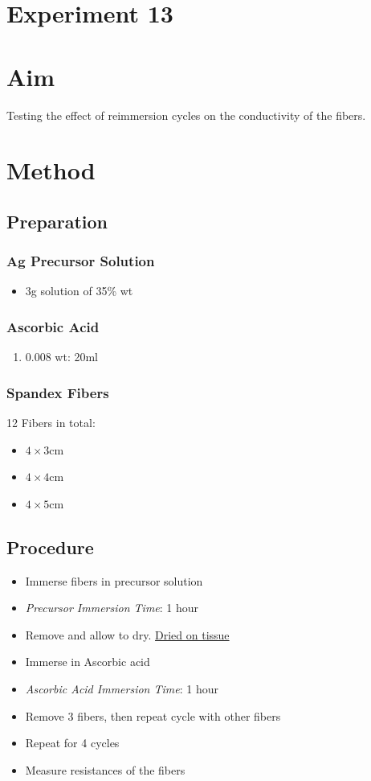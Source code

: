 \documentclass{article}
\begin{document}
\section*{Experiment 13}

\section{Aim}
Testing the effect of reimmersion cycles on the conductivity of the fibers.

\section{Method}
\subsection{Preparation}
\subsubsection{Ag Precursor Solution}
\begin{itemize}
    \item  3g solution of  35\% wt
\end{itemize}

\subsubsection{Ascorbic Acid}
\begin{enumerate}
    \item 0.008 wt: 20ml
\end{enumerate}

\subsubsection{Spandex Fibers}
12 Fibers in total:
\begin{itemize}
    \item $4\times 3$cm
    \item $4\times 4$cm
    \item $4\times 5$cm
\end{itemize}

\subsection{Procedure}
\begin{itemize}
    \item Immerse fibers in precursor solution
    \item \textit{Precursor Immersion Time}: 1 hour
    \item Remove and allow to dry. \underline{Dried on tissue}
    \item Immerse  in Ascorbic acid
    \item \textit{Ascorbic Acid Immersion Time}: 1 hour 
    \item Remove 3 fibers, then repeat cycle with other fibers 
    \item Repeat for 4 cycles
    \item Measure resistances of the fibers
\end{itemize}
\end{document}
